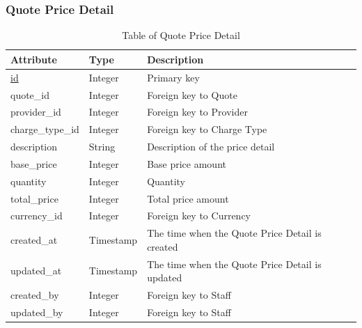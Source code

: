 \subsubsection{Quote Price Detail}
\begin{table}[H]
    \centering
    \begin{tabular}{|p{3cm}|p{2cm}|p{\dimexpr\textwidth-6.8cm}|} %
        \hline
        \rowcolor[HTML]{C0C0C0} 
        \textbf{Attribute} & \textbf{Type} & \textbf{Description} \\ \hline
        \underline{id} & Integer & Primary key \\ \hline
        quote\_id & Integer & Foreign key to Quote \\ \hline
        provider\_id & Integer & Foreign key to Provider \\ \hline
        charge\_type\_id & Integer & Foreign key to Charge Type \\ \hline
        description & String & Description of the price detail \\ \hline
        base\_price & Integer & Base price amount \\ \hline
        quantity & Integer & Quantity \\ \hline
        total\_price & Integer & Total price amount \\ \hline
        currency\_id & Integer & Foreign key to Currency \\ \hline
        created\_at & Timestamp & The time when the Quote Price Detail is created \\ \hline
        updated\_at & Timestamp & The time when the Quote Price Detail is updated \\ \hline
        created\_by & Integer & Foreign key to Staff \\ \hline
        updated\_by & Integer & Foreign key to Staff \\ \hline
    \end{tabular}
    \caption{Table of Quote Price Detail}
    \label{tab:quote-price-detail-table}
\end{table}

